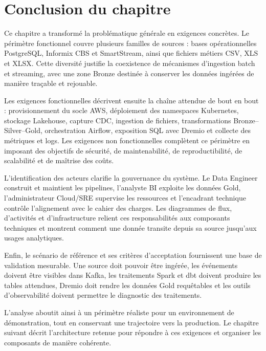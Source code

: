 \section*{Conclusion du chapitre}

Ce chapitre a transformé la problématique générale en exigences concrètes. Le périmètre fonctionnel couvre plusieurs familles de sources : bases opérationnelles PostgreSQL, Informix CBS et SmartStream, ainsi que fichiers métiers CSV, XLS et XLSX. Cette diversité justifie la coexistence de mécanismes d'ingestion batch et streaming, avec une zone Bronze destinée à conserver les données ingérées de manière traçable et rejouable.

Les exigences fonctionnelles décrivent ensuite la chaîne attendue de bout en bout : provisionnement du socle AWS, déploiement des namespaces Kubernetes, stockage Lakehouse, capture CDC, ingestion de fichiers, transformations Bronze--Silver--Gold, orchestration Airflow, exposition SQL avec Dremio et collecte des métriques et logs. Les exigences non fonctionnelles complètent ce périmètre en imposant des objectifs de sécurité, de maintenabilité, de reproductibilité, de scalabilité et de maîtrise des coûts.

L'identification des acteurs clarifie la gouvernance du système. Le Data Engineer construit et maintient les pipelines, l'analyste BI exploite les données Gold, l'administrateur Cloud/SRE supervise les ressources et l'encadrant technique contrôle l'alignement avec le cahier des charges. Les diagrammes de flux, d'activités et d'infrastructure relient ces responsabilités aux composants techniques et montrent comment une donnée transite depuis sa source jusqu'aux usages analytiques.

Enfin, le scénario de référence et ses critères d'acceptation fournissent une base de validation mesurable. Une source doit pouvoir être ingérée, les événements doivent être visibles dans Kafka, les traitements Spark et dbt doivent produire les tables attendues, Dremio doit rendre les données Gold requêtables et les outils d'observabilité doivent permettre le diagnostic des traitements.

L'analyse aboutit ainsi à un périmètre réaliste pour un environnement de démonstration, tout en conservant une trajectoire vers la production. Le chapitre suivant décrit l'architecture retenue pour répondre à ces exigences et organiser les composants de manière cohérente.

\clearpage
